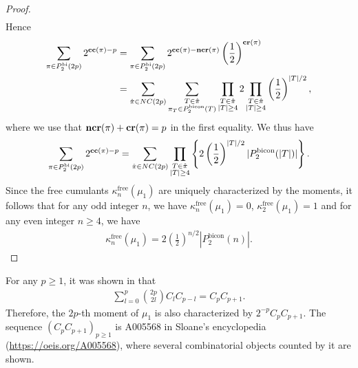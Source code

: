 \documentclass[12pt,reqno]{amsart}
\theoremstyle{plain}
\newcommand{\1}{\mathbf{1}}
\newcommand{\cumuf}{\kappa^{\operatorname{free}}}
\newcommand{\crblocks}{\operatorname{\bf cr}}
\newcommand{\ccblocks}{\operatorname{\bf cc}}
\newcommand{\ncrblocks}{\operatorname{\bf ncr}}
\begin{document}
\begin{proof}
\begin{align*}
    \end{align*}
    Hence
    \begin{align*}
        \sum_{\pi \in P_2^{\operatorname{bi}}(2p)}2^{\ccblocks(\pi)-p}&=\sum_{\pi \in P_2^{\operatorname{bi}}(2p)}2^{\ccblocks(\pi)-\ncrblocks(\pi)}\left(\frac{1}{2}\right)^{\crblocks(\pi)}\\
        &=\sum_{\hat{\pi} \in NC(2p)}\sum_{\substack{T \in \hat{\pi}\\ \pi_T \in P_2^{\operatorname{bicon}}(T)}}\prod_{\substack{T \in \hat{\pi}\\ |T| \ge 4}}2 \prod_{\substack{T \in \hat{\pi}\\ |T| \ge 4}}\left(\frac{1}{2}\right)^{|T|/2},
    \end{align*}
    where we use that $\ncrblocks(\pi)+\crblocks(\pi)=p$ in the first equality. We thus have
    \begin{align*}
        \sum_{\pi \in P_2^{\operatorname{bi}}(2p)}2^{\ccblocks(\pi)-p}=\sum_{\hat{\pi} \in NC(2p)}\prod_{\substack{T \in \hat{\pi}\\ |T| \ge 4}}\left\{2\left(\frac{1}{2}\right)^{|T|/2}|P_2^{\operatorname{bicon}}(|T|)|\right\}.
    \end{align*}
    Since the free cumulants $\cumuf_n(\mu_1)$ are uniquely characterized by the moments, it follows that for any odd integer $n$, we have $\cumuf_n(\mu_1)=0$, $\cumuf_2(\mu_1)=1$ and for any even integer $n \ge 4$, we have
    \begin{align*}
        \cumuf_n(\mu_1)=2\left(\frac{1}{2}\right)^{n/2}|P_2^{\operatorname{bicon}}(n)|.
    \end{align*}
\end{proof}
\begin{remark}
    For any $p \ge 1$, it was shown in \cite{gouyoubeauchamps1986} that
    \begin{align*}
        \sum_{l=0}^p \binom{2p}{2l}C_lC_{p-l}=C_pC_{p+1}.
    \end{align*}
    Therefore, the $2p$-th moment of $\mu_1$ is also characterized by $2^{-p}C_pC_{p+1}$. The sequence $(C_pC_{p+1})_{p \ge 1}$ is A005568 in Sloane's encyclopedia (\url{https://oeis.org/A005568}), where several combinatorial objects counted by it are shown.
\end{remark}
\end{document}
